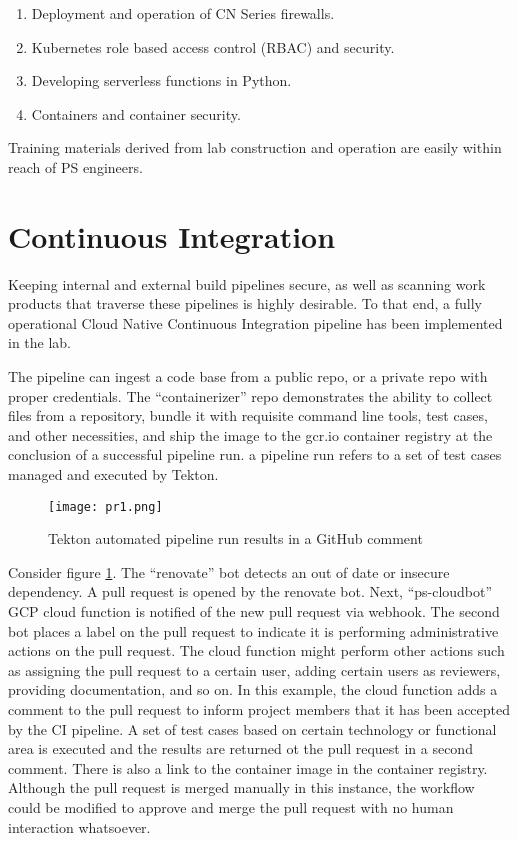 \begin{raggedright}
	\begin{enumerate}
		\item Deployment and operation of CN Series firewalls.
		\item Kubernetes role based access control (RBAC) and security.
		\item Developing serverless functions in Python.
		\item Containers and container security.
	\end{enumerate}
\end{raggedright}
\vspace{2mm}

Training materials derived from lab construction and operation are easily within reach of PS engineers. 

\section{\label{sec:CI}Continuous Integration}

Keeping internal and external build pipelines secure, as well as scanning work products that traverse these pipelines is highly desirable. To that end, a
fully operational Cloud Native Continuous Integration pipeline has been implemented in the lab.

The pipeline can ingest a code base from a public repo, or a private repo with proper credentials. The ``containerizer'' repo demonstrates the ability
to collect files from a repository, bundle it with requisite command line tools, test cases, and other necessities, and ship the image to the gcr.io container
registry at the conclusion of a successful pipeline run. a pipeline run refers to a set of test cases managed and executed by Tekton.

\begin{figure}[ht]
	\texttt{[image: pr1.png]}
	\caption{Tekton automated pipeline run results in a GitHub comment}
	\label{pr}
\end{figure}

Consider figure \ref{pr}. The ``renovate'' bot detects an out of date or insecure dependency. A pull request is opened by the renovate bot. 
Next, ``ps-cloudbot'' GCP cloud function is notified of the new pull request via webhook. The second bot places a label on the pull request to indicate
it is performing administrative actions on the pull request. The cloud function might perform other actions such as assigning the pull request to a certain user,
adding certain users as reviewers, providing documentation, and so on. In this example, the cloud function adds a comment to the pull request to inform
project members that it has been accepted by the CI pipeline. A set of test cases based on certain technology or functional area is executed and the
results are returned ot the pull request in a second comment. There is also a link to the container image in the container registry. Although the pull
request is merged manually in this instance, the workflow could be modified to approve and merge the pull request with no human interaction whatsoever.

